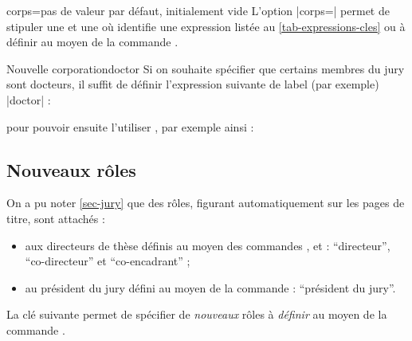 \begin{docKey}{corps}{=}{pas de valeur par défaut, initialement
    vide}
  L'option |corps=| permet de stipuler une  et une  où  identifie une
  expression listée au \vref{tab-expressions-cles} ou à définir au moyen de la
  commande .
\end{docKey}

\begin{dbexample}{Nouvelle corporation}{doctor}
  Si on souhaite spécifier que certains membres du jury sont docteurs, il
  suffit de définir  l'expression suivante de label (par
  exemple) |doctor| :
\begin{preamblecode}[title=Par exemple dans le \File{\configurationfile}]
\end{preamblecode}
  pour pouvoir ensuite l'utiliser , par
  exemple ainsi :
\begin{bodycode}
\end{bodycode}
\end{dbexample}

\subsection{Nouveaux rôles}\label{sec-nouveaux-roles}
%
%

On a pu noter \vref{sec-jury} que des rôles, figurant automatiquement sur les
pages de titre, sont attachés :
\begin{itemize}
\item aux directeurs de thèse définis au moyen des commandes
  ,  et  :
  \enquote{directeur}, \enquote{co-directeur} et \enquote{co-encadrant} ;
\item au président du jury défini au moyen de la commande
   : \enquote{président du jury}.
\end{itemize}
La clé  suivante permet de spécifier de \emph{nouveaux} rôles
à \emph{définir} au moyen de la commande .

